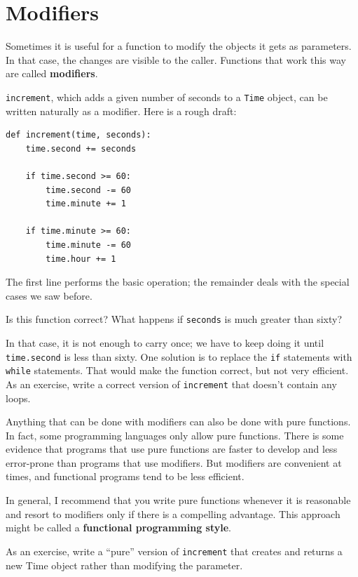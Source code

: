 \documentclass[10pt]{book}
\begin{document}
\section{Modifiers}
\label{increment}

Sometimes it is useful for a function to modify the objects it gets as
parameters.  In that case, the changes are visible to the caller.
Functions that work this way are called {\bf modifiers}.

{\tt increment}, which adds a given number of seconds to a {\tt Time}
object, can be written naturally as a
modifier.  Here is a rough draft:

\begin{verbatim}
def increment(time, seconds):
    time.second += seconds

    if time.second >= 60:
        time.second -= 60
        time.minute += 1

    if time.minute >= 60:
        time.minute -= 60
        time.hour += 1
\end{verbatim}
%
The first line performs the basic operation; the remainder deals
with the special cases we saw before.

Is this function correct?  What happens if {\tt seconds}
is much greater than sixty?

In that case, it is not enough to carry once; we have to keep doing it
until {\tt time.second} is less than sixty.  One solution is to
replace the {\tt if} statements with {\tt while} statements.  That
would make the function correct, but not very efficient.  As an
exercise, write a correct version of {\tt increment} that doesn't
contain any loops.

Anything that can be done with modifiers can also be done with pure
functions.  In fact, some programming languages only allow pure
functions.  There is some evidence that programs that use pure
functions are faster to develop and less error-prone than programs
that use modifiers.  But modifiers are convenient at times,
and functional programs tend to be less efficient.

In general, I recommend that you write pure functions whenever it is
reasonable and resort to modifiers only if there is a compelling
advantage.  This approach might be called a {\bf functional
programming style}.

As an exercise, write a ``pure'' version of {\tt increment} that
creates and returns a new Time object rather than modifying the
parameter.
\end{document}
